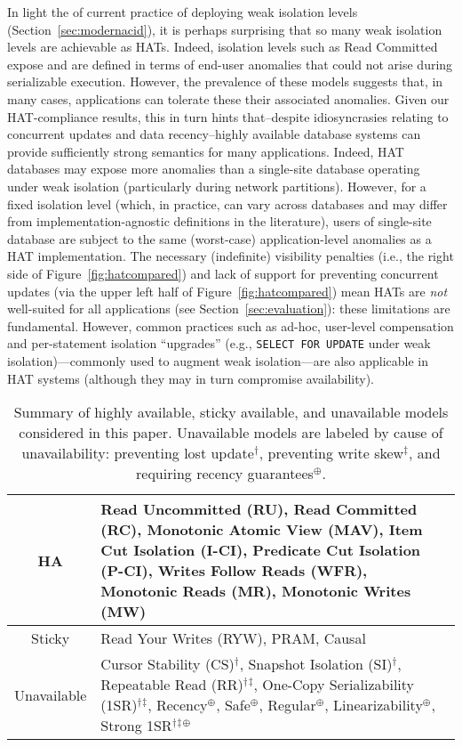 {In light the of current practice of deploying weak isolation levels
(Section~\ref{sec:modernacid}), it is perhaps surprising that so many
weak isolation levels are achievable as HATs. Indeed, isolation levels
such as Read Committed expose and are defined in terms of end-user
anomalies that could not arise during serializable execution. However,
the prevalence of these models suggests that, in many cases,
applications can tolerate these their associated anomalies. Given our
HAT-compliance results, this in turn hints that--despite
idiosyncrasies relating to concurrent updates and data recency--highly
available database systems can provide sufficiently strong semantics
for many applications. Indeed, HAT databases may expose more anomalies
than a single-site database operating under weak isolation
(particularly during network partitions). However, for a fixed
isolation level (which, in practice, can vary across databases and may
differ from implementation-agnostic definitions in the literature),
users of single-site database are subject to the same (worst-case)
application-level anomalies as a HAT implementation. The necessary
(indefinite) visibility penalties (i.e., the right side of
Figure~\ref{fig:hatcompared}) and lack of support for preventing
concurrent updates (via the upper left half of
Figure~\ref{fig:hatcompared}) mean HATs are \textit{not} well-suited
for all applications (see Section~\ref{sec:evaluation}): these
limitations are fundamental. However, common practices such as ad-hoc,
user-level compensation and per-statement isolation ``upgrades''
(e.g., \texttt{SELECT FOR UPDATE} under weak isolation)---commonly used
to augment weak isolation---are also applicable in HAT systems
(although they may in turn compromise availability).

 \newcommand{\lostupdate}{$^\dagger$}
 \newcommand{\rwskew}{$^\ddagger$}
 \newcommand{\linearizable}{$^\oplus$}

\begin{table}[t!]
\begin{tabular}{| c | p{6cm} | }\hline
HA & Read Uncommitted (RU), Read Committed (RC), Monotonic Atomic View
(MAV), Item Cut Isolation (I-CI), Predicate Cut Isolation (P-CI),
Writes Follow Reads (WFR), Monotonic Reads (MR), Monotonic Writes
(MW)\\\hline Sticky & Read Your Writes (RYW), PRAM, Causal\\\hline
Unavailable & Cursor Stability (CS)\lostupdate, Snapshot Isolation
(SI)\lostupdate, Repeatable Read (RR)\lostupdate\rwskew, One-Copy
Serializability (1SR)\lostupdate\rwskew, Recency\linearizable,
Safe\linearizable, Regular\linearizable, Linearizability\linearizable,
Strong 1SR\lostupdate\rwskew\linearizable \\\hline
\end{tabular}
\caption{Summary of highly available, sticky available, and
  unavailable models considered in this paper. Unavailable models are
  labeled by cause of unavailability: preventing lost
  update\lostupdate, preventing write skew\rwskew, and requiring
  recency guarantees\linearizable.}
\label{table:hatcompared}
\end{table}

}

